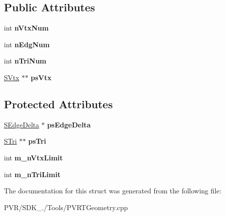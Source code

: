\subsection*{Public Attributes}
\begin{DoxyCompactItemize}
\item 
\hypertarget{struct_c_block_option_a1fea8bfedd219886f9fc8a6aa291a824}{int {\bfseries n\+Vtx\+Num}}\label{struct_c_block_option_a1fea8bfedd219886f9fc8a6aa291a824}

\item 
\hypertarget{struct_c_block_option_a7f7f048b43adbd20e89ce30eb2556706}{int {\bfseries n\+Edg\+Num}}\label{struct_c_block_option_a7f7f048b43adbd20e89ce30eb2556706}

\item 
\hypertarget{struct_c_block_option_a4434805722ee07de28b6de30da72e6f6}{int {\bfseries n\+Tri\+Num}}\label{struct_c_block_option_a4434805722ee07de28b6de30da72e6f6}

\item 
\hypertarget{struct_c_block_option_acc834642a1ef3f3e6d88a75ee5ab6df9}{\hyperlink{struct_s_vtx}{S\+Vtx} $\ast$$\ast$ {\bfseries ps\+Vtx}}\label{struct_c_block_option_acc834642a1ef3f3e6d88a75ee5ab6df9}

\end{DoxyCompactItemize}
\subsection*{Protected Attributes}
\begin{DoxyCompactItemize}
\item 
\hypertarget{struct_c_block_option_a21df5fdf085dc593aca89c64182f3b5c}{\hyperlink{struct_c_block_option_1_1_s_edge_delta}{S\+Edge\+Delta} $\ast$ {\bfseries ps\+Edge\+Delta}}\label{struct_c_block_option_a21df5fdf085dc593aca89c64182f3b5c}

\item 
\hypertarget{struct_c_block_option_a0de4be06e734ab4998b3546ad7dde053}{\hyperlink{struct_s_tri}{S\+Tri} $\ast$$\ast$ {\bfseries ps\+Tri}}\label{struct_c_block_option_a0de4be06e734ab4998b3546ad7dde053}

\item 
\hypertarget{struct_c_block_option_a6a7f0cf4b4c963f5d322f51f999c821f}{int {\bfseries m\+\_\+n\+Vtx\+Limit}}\label{struct_c_block_option_a6a7f0cf4b4c963f5d322f51f999c821f}

\item 
\hypertarget{struct_c_block_option_a85d7b493e5deb211e5855680eb26295f}{int {\bfseries m\+\_\+n\+Tri\+Limit}}\label{struct_c_block_option_a85d7b493e5deb211e5855680eb26295f}

\end{DoxyCompactItemize}


The documentation for this struct was generated from the following file\+:\begin{DoxyCompactItemize}
\item 
P\+V\+R/\+S\+D\+K\+\_./\+Tools/P\+V\+R\+T\+Geometry.\+cpp\end{DoxyCompactItemize}

